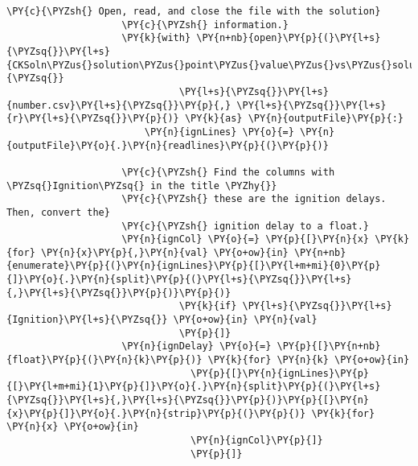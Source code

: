 \begin{Verbatim}[commandchars=\\\{\}]
                    \PY{c}{\PYZsh{} Open, read, and close the file with the solution}
                    \PY{c}{\PYZsh{} information.}
                    \PY{k}{with} \PY{n+nb}{open}\PY{p}{(}\PY{l+s}{\PYZsq{}}\PY{l+s}{CKSoln\PYZus{}solution\PYZus{}point\PYZus{}value\PYZus{}vs\PYZus{}solution\PYZus{}}\PY{l+s}{\PYZsq{}}
                              \PY{l+s}{\PYZsq{}}\PY{l+s}{number.csv}\PY{l+s}{\PYZsq{}}\PY{p}{,} \PY{l+s}{\PYZsq{}}\PY{l+s}{r}\PY{l+s}{\PYZsq{}}\PY{p}{)} \PY{k}{as} \PY{n}{outputFile}\PY{p}{:}
                        \PY{n}{ignLines} \PY{o}{=} \PY{n}{outputFile}\PY{o}{.}\PY{n}{readlines}\PY{p}{(}\PY{p}{)}

                    \PY{c}{\PYZsh{} Find the columns with \PYZsq{}Ignition\PYZsq{} in the title \PYZhy{}}
                    \PY{c}{\PYZsh{} these are the ignition delays. Then, convert the}
                    \PY{c}{\PYZsh{} ignition delay to a float.}
                    \PY{n}{ignCol} \PY{o}{=} \PY{p}{[}\PY{n}{x} \PY{k}{for} \PY{n}{x}\PY{p}{,}\PY{n}{val} \PY{o+ow}{in} \PY{n+nb}{enumerate}\PY{p}{(}\PY{n}{ignLines}\PY{p}{[}\PY{l+m+mi}{0}\PY{p}{]}\PY{o}{.}\PY{n}{split}\PY{p}{(}\PY{l+s}{\PYZsq{}}\PY{l+s}{,}\PY{l+s}{\PYZsq{}}\PY{p}{)}\PY{p}{)}
                              \PY{k}{if} \PY{l+s}{\PYZsq{}}\PY{l+s}{Ignition}\PY{l+s}{\PYZsq{}} \PY{o+ow}{in} \PY{n}{val}
                              \PY{p}{]}
                    \PY{n}{ignDelay} \PY{o}{=} \PY{p}{[}\PY{n+nb}{float}\PY{p}{(}\PY{n}{k}\PY{p}{)} \PY{k}{for} \PY{n}{k} \PY{o+ow}{in}
                                \PY{p}{[}\PY{n}{ignLines}\PY{p}{[}\PY{l+m+mi}{1}\PY{p}{]}\PY{o}{.}\PY{n}{split}\PY{p}{(}\PY{l+s}{\PYZsq{}}\PY{l+s}{,}\PY{l+s}{\PYZsq{}}\PY{p}{)}\PY{p}{[}\PY{n}{x}\PY{p}{]}\PY{o}{.}\PY{n}{strip}\PY{p}{(}\PY{p}{)} \PY{k}{for} \PY{n}{x} \PY{o+ow}{in}
                                \PY{n}{ignCol}\PY{p}{]}
                                \PY{p}{]}


\end{Verbatim}
